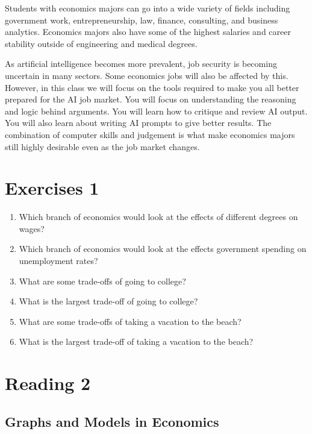 \documentclass[
]{book}
\begin{document}
Students with economics majors can go into a wide variety of fields including government work, entrepreneurship, law, finance, consulting, and business analytics. Economics majors also have some of the highest salaries and career stability outside of engineering and medical degrees.

As artificial intelligence becomes more prevalent, job security is becoming uncertain in many sectors. Some economics jobs will also be affected by this. However, in this class we will focus on the tools required to make you all better prepared for the AI job market. You will focus on understanding the reasoning and logic behind arguments. You will learn how to critique and review AI output. You will also learn about writing AI prompts to give better results. The combination of computer skills and judgement is what make economics majors still highly desirable even as the job market changes.

\section{Exercises 1}\label{exercises-1}

\begin{enumerate}
\def\labelenumi{\arabic{enumi}.}
\item
  Which branch of economics would look at the effects of different degrees on wages?
\item
  Which branch of economics would look at the effects government spending on unemployment rates?
\item
  What are some trade-offs of going to college?
\item
  What is the largest trade-off of going to college?
\item
  What are some trade-offs of taking a vacation to the beach?
\item
  What is the largest trade-off of taking a vacation to the beach?
\end{enumerate}

\section{Reading 2}\label{reading-2}

\subsection{Graphs and Models in Economics}\label{graphs-and-models-in-economics}
\end{document}
